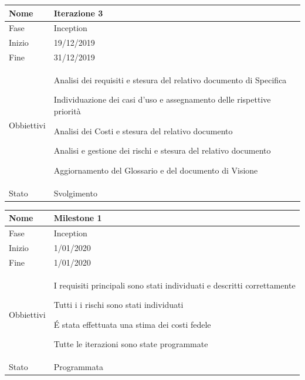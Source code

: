 \begin{center}
\begin{tabular}{ |p{}|p{}|  }
\hline
Nome & Iterazione 3 \\\hline
Fase & Inception \\\hline
Inizio & 19/12/2019 \\\hline
Fine &  31/12/2019 \\\hline
Obbiettivi & 
	\begin{compactitem}
		\item Analisi dei  requisiti e stesura del relativo documento di Specifica
		\item Individuazione dei casi d'uso e assegnamento delle rispettive priorità
		\item Analisi dei Costi e stesura del relativo documento
		\item Analisi e gestione dei rischi e stesura del relativo documento
		\item Aggiornamento del Glossario e del documento di Visione
	\end{compactitem}\\\hline
Stato &  Svolgimento \\\hline
\end{tabular}
\label{table:3}\newline

\begin{tabular}{ |p{2cm}|p{10cm}|  }
\hline
Nome & Milestone 1\\\hline
Fase & Inception \\\hline
Inizio & 1/01/2020 \\\hline
Fine &  1/01/2020 \\\hline
Obbiettivi & 
	\begin{compactitem}
		\item I requisiti principali sono stati individuati e descritti correttamente
		\item Tutti i i rischi sono stati individuati
		\item \'E stata effettuata una stima dei costi fedele
		\item Tutte le iterazioni sono state programmate
	\end{compactitem}\\\hline
Stato &  Programmata \\\hline
\end{tabular}
\label{table:milestone1}\newline


\end{center}
